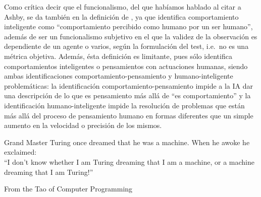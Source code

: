 \documentclass[12pt]{memoir}
\begin{document}
Como crítica decir que el funcionalismo, del que habíamos hablado al citar a Ashby, se da también en la definición de \cite{Turing1950cmi}, ya que identifica comportamiento inteligente como ``comportamiento percibido como humano por un ser humano'', además de ser un funcionalismo subjetivo en el que la validez de la observación es dependiente de un agente o varios, según la formulación del test, i.e.\ no es una métrica objetiva. Además, ésta definición es limitante, pues sólo identifica comportamientos inteligentes o pensamientos con actuaciones humanas, siendo ambas identificaciones comportamiento-pensamiento y humano-inteligente problemáticas: la identificación comportamiento-pensamiento impide a la IA dar una descripción de lo que es pensamiento más allá de ``es comportamiento'' y la identificación humano-inteligente impide la resolución de problemas que están más allá del proceso de pensamiento humano en formas diferentes que un simple aumento en la velocidad o precisión de los mismos. 


\newpage

\printbibliography

\newpage


\epigraph{Grand Master Turing once dreamed that he was a machine. When he awoke he exclaimed: \\

“I don't know whether I am Turing dreaming that I am a machine, or a machine dreaming that I am Turing!”}{From the Tao of Computer Programming}
\end{document}
